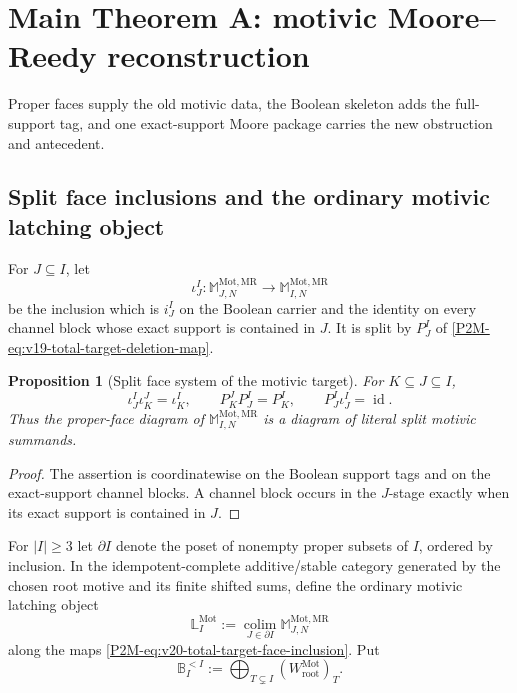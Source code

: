 \documentclass[11pt]{article}
\newtheorem{proposition}[theorem]{Proposition}
\theoremstyle{remark}
\newcommand{\Mot}{\mathrm{Mot}}
\newcommand{\rootc}{\mathrm{root}}
\newcommand{\MR}{\mathrm{MR}}
\begin{document}
\section{Main Theorem A: motivic Moore--Reedy reconstruction}

Proper faces supply the old motivic data, the Boolean skeleton adds the
full-support tag, and one exact-support Moore package carries the new
obstruction and antecedent.

\subsection{Split face inclusions and the ordinary motivic latching object}

For $J\subseteq I$, let
\begin{equation}\label{P2M-eq:v20-total-target-face-inclusion}
 \iota_J^I:
 \mathbb M_{J,N}^{\Mot,\MR}\longrightarrow
 \mathbb M_{I,N}^{\Mot,\MR}
\end{equation}
be the inclusion which is $i_J^I$ on the Boolean carrier and the identity on
every channel block whose exact support is contained in $J$.  It is split by
$P_J^I$ of \eqref{P2M-eq:v19-total-target-deletion-map}.

\begin{proposition}[Split face system of the motivic target]
\label{P2M-prop:v20-split-face-system}
For $K\subseteq J\subseteq I$,
\[
 \iota_J^I\iota_K^J=\iota_K^I,
 \qquad
 P_K^JP_J^I=P_K^I,
 \qquad
 P_J^I\iota_J^I=\operatorname{id}.
\]
Thus the proper-face diagram of $\mathbb M_{I,N}^{\Mot,\MR}$ is a diagram of
literal split motivic summands.
\end{proposition}

\begin{proof}
The assertion is coordinatewise on the Boolean support tags and on the
exact-support channel blocks.  A channel block occurs in the $J$-stage
exactly when its exact support is contained in $J$.
\end{proof}

For $|I|\ge3$ let $\partial I$ denote the poset of nonempty proper subsets of
$I$, ordered by inclusion.  In the idempotent-complete additive/stable
category generated by the chosen root motive and its finite shifted sums,
define the ordinary motivic latching object
\begin{equation}
 \boxed{
 \mathbb L_I^{\Mot}
 :=
 \operatorname*{colim}_{J\in\partial I}
 \mathbb M_{J,N}^{\Mot,\MR}}
\end{equation}
along the maps \eqref{P2M-eq:v20-total-target-face-inclusion}.  Put
\[
 \mathbb B_I^{<I}
 :=
 \bigoplus_{T\subsetneq I}(W_{\rootc}^{\Mot})_T.
\]
\end{document}
